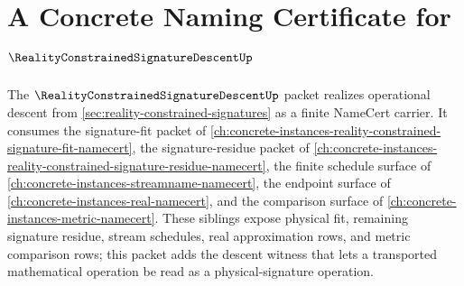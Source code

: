 \chapter{A Concrete Naming Certificate for $\RealityConstrainedSignatureDescentUp$}
\label{ch:concrete-instances-reality-constrained-signature-descent-namecert}

The $\RealityConstrainedSignatureDescentUp$ packet realizes operational descent from \autoref{sec:reality-constrained-signatures} as a finite NameCert carrier. It consumes the signature-fit packet of \autoref{ch:concrete-instances-reality-constrained-signature-fit-namecert}, the signature-residue packet of \autoref{ch:concrete-instances-reality-constrained-signature-residue-namecert}, the finite schedule surface of \autoref{ch:concrete-instances-streamname-namecert}, the endpoint surface of \autoref{ch:concrete-instances-real-namecert}, and the comparison surface of \autoref{ch:concrete-instances-metric-namecert}. These siblings expose physical fit, remaining signature residue, stream schedules, real approximation rows, and metric comparison rows; this packet adds the descent witness that lets a transported mathematical operation be read as a physical-signature operation.

